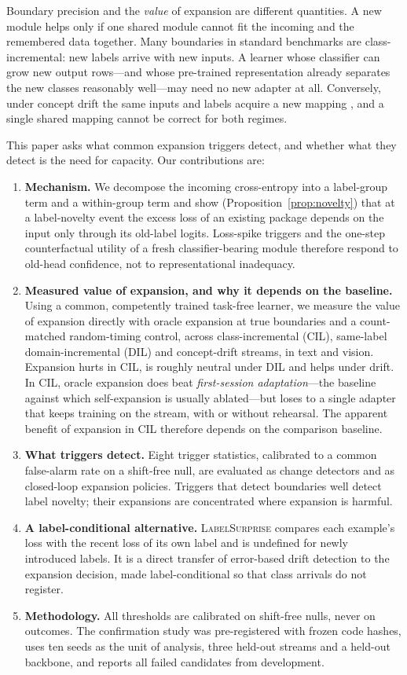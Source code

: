 \documentclass[10pt]{article}
\newcommand{\ls}{\textsc{LabelSurprise}}
\begin{document}
Boundary precision and the \emph{value} of expansion are different quantities. A new module helps only if one shared module cannot fit the incoming and the remembered data together. Many boundaries in standard benchmarks are class-incremental: new labels arrive with new inputs. A learner whose classifier can grow new output rows---and whose pre-trained representation already separates the new classes reasonably well---may need no new adapter at all. Conversely, under concept drift the same inputs and labels acquire a new mapping \citep{gama2014survey}, and a single shared mapping cannot be correct for both regimes.

This paper asks what common expansion triggers detect, and whether what they detect is the need for capacity. Our contributions are:
\begin{enumerate}
\item \textbf{Mechanism.} We decompose the incoming cross-entropy into a label-group term and a within-group term and show (Proposition~\ref{prop:novelty}) that at a label-novelty event the excess loss of an existing package depends on the input only through its old-label logits. Loss-spike triggers and the one-step counterfactual utility of a fresh classifier-bearing module therefore respond to old-head confidence, not to representational inadequacy.
\item \textbf{Measured value of expansion, and why it depends on the baseline.} Using a common, competently trained task-free learner, we measure the value of expansion directly with oracle expansion at true boundaries and a count-matched random-timing control, across class-incremental (CIL), same-label domain-incremental (DIL) and concept-drift streams, in text and vision. Expansion hurts in CIL, is roughly neutral under DIL and helps under drift. In CIL, oracle expansion does beat \emph{first-session adaptation}---the baseline against which self-expansion is usually ablated---but loses to a single adapter that keeps training on the stream, with or without rehearsal. The apparent benefit of expansion in CIL therefore depends on the comparison baseline.
\item \textbf{What triggers detect.} Eight trigger statistics, calibrated to a common false-alarm rate on a shift-free null, are evaluated as change detectors and as closed-loop expansion policies. Triggers that detect boundaries well detect label novelty; their expansions are concentrated where expansion is harmful.
\item \textbf{A label-conditional alternative.} \ls{} compares each example's loss with the recent loss of its own label and is undefined for newly introduced labels. It is a direct transfer of error-based drift detection \citep{gama2004ddm,bifet2007adwin} to the expansion decision, made label-conditional so that class arrivals do not register.
\item \textbf{Methodology.} All thresholds are calibrated on shift-free nulls, never on outcomes. The confirmation study was pre-registered with frozen code hashes, uses ten seeds as the unit of analysis, three held-out streams and a held-out backbone, and reports all failed candidates from development.
\end{enumerate}
\end{document}
